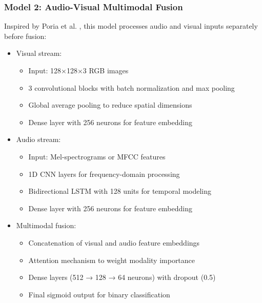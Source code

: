 \documentclass[conference,compsoc]{IEEEtran}
\begin{document}
\subsubsection{Model 2: Audio-Visual Multimodal Fusion}
Inspired by Poria et al. \cite{poria2016}, this model processes audio and visual inputs separately before fusion:
\begin{itemize}
    \item Visual stream:
        \begin{itemize}
            \item Input: 128×128×3 RGB images
            \item 3 convolutional blocks with batch normalization and max pooling
            \item Global average pooling to reduce spatial dimensions
            \item Dense layer with 256 neurons for feature embedding
        \end{itemize}
    \item Audio stream:
        \begin{itemize}
            \item Input: Mel-spectrograms or MFCC features
            \item 1D CNN layers for frequency-domain processing
            \item Bidirectional LSTM with 128 units for temporal modeling
            \item Dense layer with 256 neurons for feature embedding
        \end{itemize}
    \item Multimodal fusion:
        \begin{itemize}
            \item Concatenation of visual and audio feature embeddings
            \item Attention mechanism to weight modality importance
            \item Dense layers (512 → 128 → 64 neurons) with dropout (0.5)
            \item Final sigmoid output for binary classification
        \end{itemize}
\end{itemize}
\end{document}
